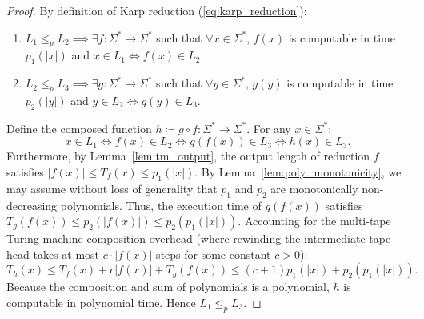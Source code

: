 \documentclass[11pt, letterpaper]{article}
\begin{document}
\begin{proof}
By definition of Karp reduction (\ref{eq:karp_reduction}):
\begin{enumerate}
    \item $L_1 \le_p L_2 \implies \exists f: \Sigma^* \to \Sigma^*$ such that $\forall x \in \Sigma^*$, $f(x)$ is computable in time $p_1(|x|)$ and $x \in L_1 \iff f(x) \in L_2$.
    \item $L_2 \le_p L_3 \implies \exists g: \Sigma^* \to \Sigma^*$ such that $\forall y \in \Sigma^*$, $g(y)$ is computable in time $p_2(|y|)$ and $y \in L_2 \iff g(y) \in L_3$.
\end{enumerate}
Define the composed function $h \coloneqq g \circ f: \Sigma^* \to \Sigma^*$. 
For any $x \in \Sigma^*$:
\begin{equation}
    x \in L_1 \iff f(x) \in L_2 \iff g(f(x)) \in L_3 \iff h(x) \in L_3.
\end{equation}
Furthermore, by Lemma~\ref{lem:tm_output}, the output length of reduction $f$ satisfies $|f(x)| \le T_f(x) \le p_1(|x|)$. By Lemma~\ref{lem:poly_monotonicity}, we may assume without loss of generality that $p_1$ and $p_2$ are monotonically non-decreasing polynomials. Thus, the execution time of $g(f(x))$ satisfies $T_g(f(x)) \le p_2(|f(x)|) \le p_2(p_1(|x|))$.
Accounting for the multi-tape Turing machine composition overhead (where rewinding the intermediate tape head takes at most $c \cdot |f(x)|$ steps for some constant $c > 0$):
\begin{equation}
    T_h(x) \le T_f(x) + c |f(x)| + T_g(f(x)) \le (c + 1) p_1(|x|) + p_2(p_1(|x|)).
\end{equation}
Because the composition and sum of polynomials is a polynomial, $h$ is computable in polynomial time. Hence $L_1 \le_p L_3$.
\end{proof}
\end{document}

